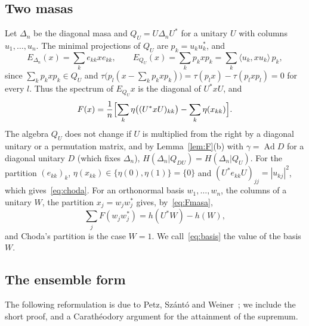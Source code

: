 \documentclass[11pt]{article}
\DeclareMathOperator{\Ad}{Ad}
\theoremstyle{plain}
\theoremstyle{definition}
\theoremstyle{remark}
\begin{document}
\subsection{Two masas}

Let $\Delta_n$ be the diagonal masa and $Q_U=U\Delta_nU^*$ for a unitary $U$ with columns $u_1,\dots,u_n$. The minimal
projections of $Q_U$ are $p_k=u_ku_k^*$, and
\begin{equation}\label{eq:EQ}
  E_{\Delta_n}(x)=\sum_ke_{kk}xe_{kk},\qquad E_{Q_U}(x)=\sum_kp_kxp_k=\sum_k\langle u_k,xu_k\rangle\,p_k,
\end{equation}
since $\sum_kp_kxp_k\in Q_U$ and $\tau\bigl(p_l(x-\sum_kp_kxp_k)\bigr)=\tau(p_lx)-\tau(p_lxp_l)=0$ for every $l$. Thus the
spectrum of $E_{Q_U}x$ is the diagonal of $U^*xU$, and
\begin{equation}\label{eq:Fmasa}
  F(x)=\frac1n\Bigl[\sum_k\eta\bigl((U^*xU)_{kk}\bigr)-\sum_k\eta(x_{kk})\Bigr].
\end{equation}
The algebra $Q_U$ does not change if $U$ is multiplied from the right by a diagonal unitary or a permutation matrix, and by
Lemma~\ref{lem:F}(b) with $\gamma=\Ad D$ for a diagonal unitary $D$ (which fixes $\Delta_n$), $H(\Delta_n|Q_{DU})=H(\Delta_n|Q_U)$.
For the partition $(e_{kk})_k$, $\eta(x_{kk})\in\{\eta(0),\eta(1)\}=\{0\}$ and $(U^*e_{kk}U)_{jj}=|u_{kj}|^2$, which
gives~\eqref{eq:choda}. For an orthonormal basis $w_1,\dots,w_n$, the columns of a unitary $W$, the partition
$x_j=w_jw_j^*$ gives, by~\eqref{eq:Fmasa},
\begin{equation}\label{eq:basis}
  \sum_jF(w_jw_j^*)=h(U^*W)-h(W),
\end{equation}
and Choda's partition is the case $W=1$. We call~\eqref{eq:basis} the value of the basis $W$.

\subsection{The ensemble form}

The following reformulation is due to Petz, Sz\'ant\'o and Weiner~\cite[Section~3, Lemma~1 and (7), (8)]{petz2009}; we
include the short proof, and a Carath\'eodory argument for the attainment of the supremum.
\end{document}

